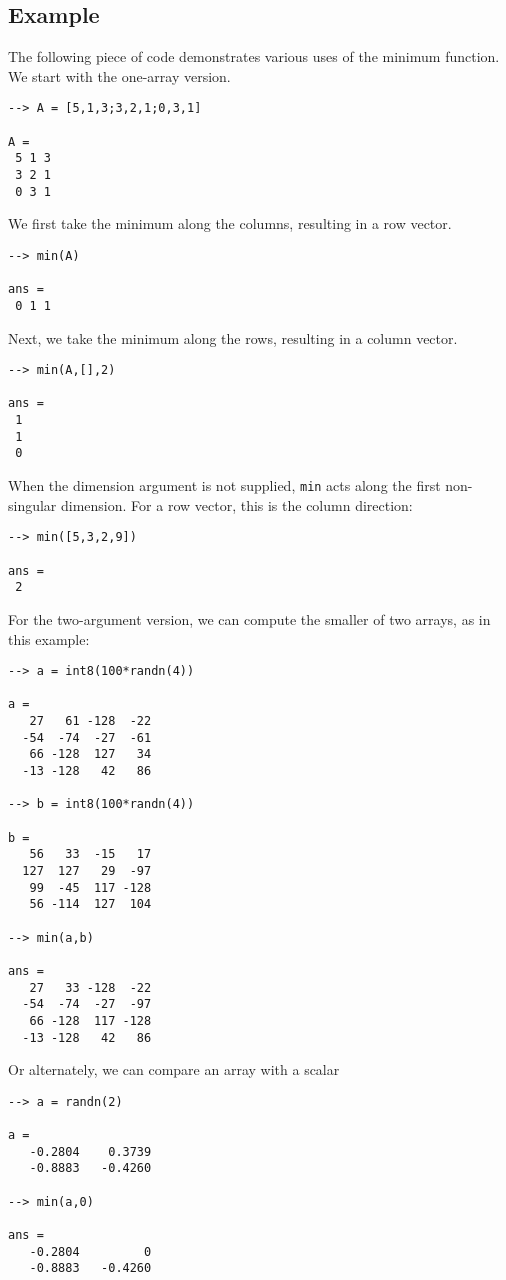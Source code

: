\subsection{Example}

The following piece of code demonstrates various uses of the minimum
function.  We start with the one-array version.
\begin{verbatim}
--> A = [5,1,3;3,2,1;0,3,1]

A = 
 5 1 3 
 3 2 1 
 0 3 1 
\end{verbatim}
We first take the minimum along the columns, resulting in a row vector.
\begin{verbatim}
--> min(A)

ans = 
 0 1 1 
\end{verbatim}
Next, we take the minimum along the rows, resulting in a column vector.
\begin{verbatim}
--> min(A,[],2)

ans = 
 1 
 1 
 0 
\end{verbatim}
When the dimension argument is not supplied, \verb|min| acts along the first 
non-singular dimension.  For a row vector, this is the column direction:
\begin{verbatim}
--> min([5,3,2,9])

ans = 
 2 
\end{verbatim}

For the two-argument version, we can compute the smaller of two arrays,
as in this example:
\begin{verbatim}
--> a = int8(100*randn(4))

a = 
   27   61 -128  -22 
  -54  -74  -27  -61 
   66 -128  127   34 
  -13 -128   42   86 

--> b = int8(100*randn(4))

b = 
   56   33  -15   17 
  127  127   29  -97 
   99  -45  117 -128 
   56 -114  127  104 

--> min(a,b)

ans = 
   27   33 -128  -22 
  -54  -74  -27  -97 
   66 -128  117 -128 
  -13 -128   42   86 
\end{verbatim}
Or alternately, we can compare an array with a scalar
\begin{verbatim}
--> a = randn(2)

a = 
   -0.2804    0.3739 
   -0.8883   -0.4260 

--> min(a,0)

ans = 
   -0.2804         0 
   -0.8883   -0.4260 
\end{verbatim}
